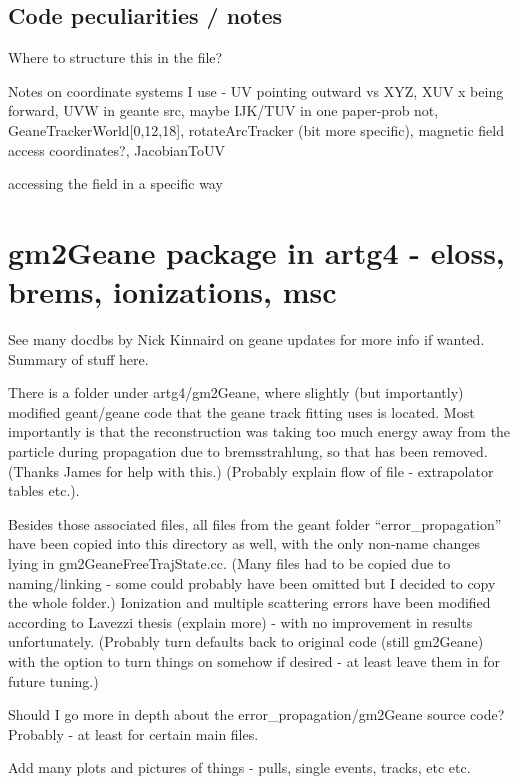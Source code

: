 \documentclass{article}
\begin{document}
\subsection{Code peculiarities / notes}

Where to structure this in the file?

Notes on coordinate systems I use - UV pointing outward vs XYZ, XUV x being forward, UVW in geante src, maybe IJK/TUV in one paper-prob not, GeaneTrackerWorld[0,12,18], rotateArcTracker (bit more specific), magnetic field access coordinates?, JacobianToUV

accessing the field in a specific way



\section{gm2Geane package in artg4 - eloss, brems, ionizations, msc}

See many docdbs by Nick Kinnaird on geane updates for more info if wanted. Summary of stuff here.


There is a folder under artg4/gm2Geane, where slightly (but importantly) modified geant/geane code that the geane track fitting uses is located. Most importantly is that the reconstruction was taking too much energy away from the particle during propagation due to bremsstrahlung, so that has been removed. (Thanks James for help with this.) (Probably explain flow of file - extrapolator tables etc.).

Besides those associated files, all files from the geant folder ``error\_propagation'' have been copied into this directory as well, with the only non-name changes lying in gm2GeaneFreeTrajState.cc. (Many files had to be copied due to naming/linking - some could probably have been omitted but I decided to copy the whole folder.) Ionization and multiple scattering errors have been modified according to Lavezzi thesis (explain more) - with no improvement in results unfortunately. (Probably turn defaults back to original code (still gm2Geane) with the option to turn things on somehow if desired - at least leave them in for future tuning.)

Should I go more in depth about the error\_propagation/gm2Geane source code? Probably - at least for certain main files.


Add many plots and pictures of things - pulls, single events, tracks, etc etc.
\end{document}

